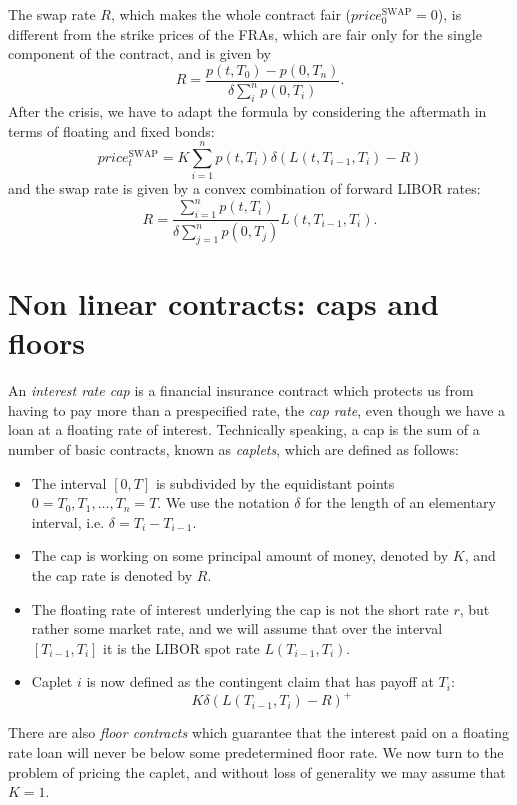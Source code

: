 The swap rate $R$, which makes the whole contract fair ($price_0^{\text{SWAP}} = 0$), is different from the strike prices of the FRAs, which are fair only for the single component of the contract, and is given by
\begin{equation}
    R = \frac{p(t,T_0)-p(0,T_n)}{\delta\sum_i^n p(0,T_i)}.
\end{equation}
After the crisis, we have to adapt the formula by considering the aftermath in terms of floating and fixed bonds:
\begin{equation}
    price_t^{\text{SWAP}} = K \sum^n_{i=1}p(t,T_i) \delta (L(t,T_{i-1},T_i)-R)
\end{equation}
and the swap rate is given by a convex combination of forward LIBOR rates:
\begin{equation}
    R = \frac{\sum_{i=1}^n p(t,T_i)}{\delta\sum_{j=1}^n p(0,T_j)}L(t,T_{i-1},T_i).
\end{equation}%

\section{Non linear contracts: caps and floors} %
An \emph{interest rate cap} is a financial insurance contract which protects us from having to pay more than a prespecified rate, the \emph{cap rate}, even though we have a loan at a floating rate of interest. Technically speaking, a cap is the sum of a number of basic contracts, known as \emph{caplets}, which are defined as follows:
\begin{itemize}
    \item The interval $[0,T]$ is subdivided by the equidistant points $0 = T_0,T_1,\dots,T_n = T$. We use the notation $\delta$ for the length of an elementary interval, i.e. $\delta=T_i - T_{i-1}$.
    \item The cap is working on some principal amount of money, denoted by $K$, and the cap rate is denoted by $R$.
    \item The floating rate of interest underlying the cap is not the short rate $r$, but rather some market rate, and we will assume that over the interval $[T_{i-1}, T_i]$ it is the LIBOR spot rate $L(T_{i-1}, T_i)$.
    \item Caplet $i$ is now defined as the contingent claim that has payoff at $T_i$:
    \begin{equation}\label{caplet-payoff}
        K\delta(L(T_{i-1},T_i)-R)^+
    \end{equation}
\end{itemize}
There are also \emph{floor contracts} which guarantee that the interest paid on a floating rate loan will never be below some predetermined floor rate. We now turn to the problem of pricing the caplet, and without loss of generality we may assume that $K = 1$.

